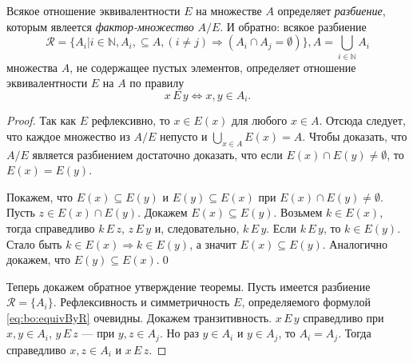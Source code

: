 \begin{Theor}
    Всякое отношение эквивалентности $E$ на множестве $A$ определяет \emph{разбиение}, которым явлеется \emph{фактор-множество} $A/E$. И обратно: всякое разбиение 
    \[
        \mathcal{R}=\{A_i|i\in \mathbb{N}, A_i,\subseteq A,(i\neq j)\Rightarrow (A_i\cap A_j=\emptyset)\},A=\bigcup_{i\in\mathbb{N}} A_i
    \]
    множества $A$, не содержащее пустых элементов, определяет отношение эквивалентности $E$ на $A$ по правилу \begin{equation}
        x\,E\,y\Leftrightarrow x,y\in A_i.
        \label{eq:bo:equivByR}
    \end{equation}
\end{Theor}
\begin{proof}
    Так как $E$ рефлексивно, то $x\in E(x)$ для любого $x\in A$. Отсюда следует, что каждое множество из $A/E$ непусто и $\bigcup_{x\in A}E(x)=A$. Чтобы доказать, что $A/E$ является разбиением достаточно доказать, что если $E(x)\cap E(y)\neq\emptyset$, то $E(x)=E(y)$.
    
    Покажем, что $E(x)\subseteq E(y)$ и $E(y)\subseteq E(x)$ при $E(x)\cap E(y)\neq\emptyset$. Пусть $z\in E(x)\cap E(y)$. Докажем $E(x)\subseteq E(y)$. Возьмем $k\in E(x)$, тогда справедливо $k\,E\,z$, $z\,E\,y$ и, следовательно, $k\,E\,y$. Если $k\,E\,y$, то $k\in E(y)$. Стало быть $k\in E(x)\Rightarrow k\in E(y)$, а значит $E(x)\subseteq E(y)$. Аналогично докажем, что $E(y)\subseteq E(x)$.\qed
    
    Теперь докажем обратное утверждение теоремы. Пусть имеется разбиение $\mathcal{R}=\{A_i\}$. Рефлексивность и симметричность $E$, определяемого формулой \eqref{eq:bo:equivByR} очевидны. Докажем транзитивность. $x\,E\,y$ справедливо при $x,y\in A_i$, $y\,E\,z$ --- при $y,z\in A_j$. Но раз $y\in A_i$ и $y\in A_j$, то $A_i=A_j$. Тогда справедливо $x,z\in A_i$ и $x\,E\,z$.
\end{proof}

